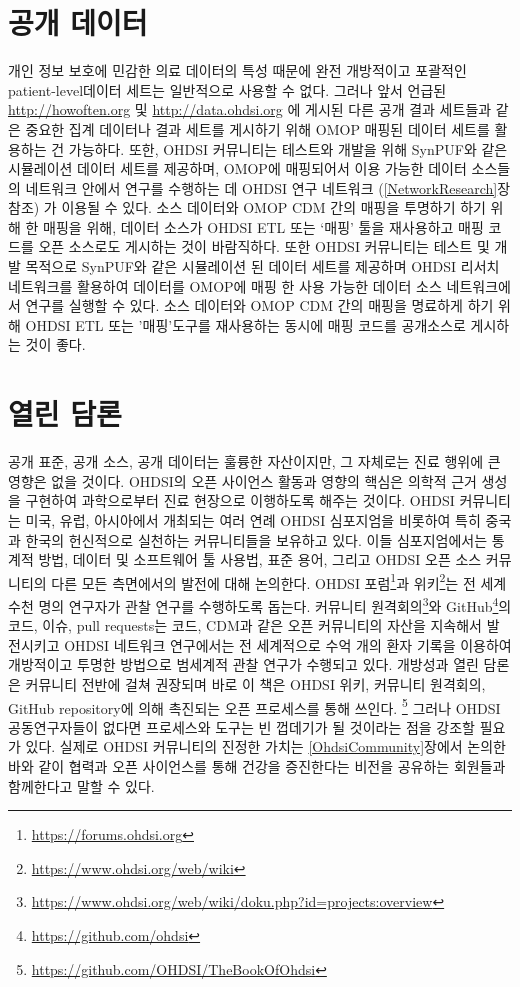 \documentclass[11pt]{book}
\let\rmarkdownfootnote\footnote%
\def\footnote{\protect\rmarkdownfootnote}
\theoremstyle{definition}
\theoremstyle{definition}
\theoremstyle{definition}
\theoremstyle{remark}
\begin{document}
\section{공개 데이터}\label{-}


개인 정보 보호에 민감한 의료 데이터의 특성 때문에 완전 개방적이고
포괄적인 patient-level데이터 세트는 일반적으로 사용할 수 없다. 그러나
앞서 언급된 \url{http://howoften.org} 및 \url{http://data.ohdsi.org} 에
게시된 다른 공개 결과 세트들과 같은 중요한 집계 데이터나 결과 세트를
게시하기 위해 OMOP 매핑된 데이터 세트를 활용하는 건 가능하다. 또한,
OHDSI 커뮤니티는 테스트와 개발을 위해 SynPUF와 같은 시뮬레이션 데이터
세트를 제공하며, OMOP에 매핑되어서 이용 가능한 데이터 소스들의 네트워크
안에서 연구를 수행하는 데 OHDSI 연구 네트워크 (\ref{NetworkResearch}장
참조) 가 이용될 수 있다. 소스 데이터와 OMOP CDM 간의 매핑을 투명하기
하기 위해 한 매핑을 위해, 데이터 소스가 OHDSI ETL 또는 `매핑' 툴을
재사용하고 매핑 코드를 오픈 소스로도 게시하는 것이 바람직하다. 또한
OHDSI 커뮤니티는 테스트 및 개발 목적으로 SynPUF와 같은 시뮬레이션 된
데이터 세트를 제공하며 OHDSI 리서치 네트워크를 활용하여 데이터를 OMOP에
매핑 한 사용 가능한 데이터 소스 네트워크에서 연구를 실행할 수 있다. 소스
데이터와 OMOP CDM 간의 매핑을 명료하게 하기 위해 OHDSI ETL 또는
'매핑'도구를 재사용하는 동시에 매핑 코드를 공개소스로 게시하는 것이
좋다.

\section{열린 담론}\label{-}


공개 표준, 공개 소스, 공개 데이터는 훌륭한 자산이지만, 그 자체로는 진료
행위에 큰 영향은 없을 것이다. OHDSI의 오픈 사이언스 활동과 영향의 핵심은
의학적 근거 생성을 구현하여 과학으로부터 진료 현장으로 이행하도록 해주는
것이다. OHDSI 커뮤니티는 미국, 유럽, 아시아에서 개최되는 여러 연례 OHDSI
심포지엄을 비롯하여 특히 중국과 한국의 헌신적으로 실천하는 커뮤니티들을
보유하고 있다. 이들 심포지엄에서는 통계적 방법, 데이터 및 소프트웨어 툴
사용법, 표준 용어, 그리고 OHDSI 오픈 소스 커뮤니티의 다른 모든
측면에서의 발전에 대해 논의한다. OHDSI 포럼\footnote{\url{https://forums.ohdsi.org}}과
위키\footnote{\url{https://www.ohdsi.org/web/wiki}}는 전 세계 수천 명의
연구자가 관찰 연구를 수행하도록 돕는다. 커뮤니티 원격회의\footnote{\url{https://www.ohdsi.org/web/wiki/doku.php?id=projects:overview}}와
GitHub\footnote{\url{https://github.com/ohdsi}}의 코드, 이슈, pull
requests는 코드, CDM과 같은 오픈 커뮤니티의 자산을 지속해서 발전시키고
OHDSI 네트워크 연구에서는 전 세계적으로 수억 개의 환자 기록을 이용하여
개방적이고 투명한 방법으로 범세계적 관찰 연구가 수행되고 있다. 개방성과
열린 담론은 커뮤니티 전반에 걸쳐 권장되며 바로 이 책은 OHDSI 위키,
커뮤니티 원격회의, GitHub repository에 의해 촉진되는 오픈 프로세스를
통해 쓰인다. \footnote{\url{https://github.com/OHDSI/TheBookOfOhdsi}}
그러나 OHDSI 공동연구자들이 없다면 프로세스와 도구는 빈 껍데기가 될
것이라는 점을 강조할 필요가 있다. 실제로 OHDSI 커뮤니티의 진정한 가치는
\ref{OhdsiCommunity}장에서 논의한 바와 같이 협력과 오픈 사이언스를 통해
건강을 증진한다는 비전을 공유하는 회원들과 함께한다고 말할 수 있다.
\end{document}
